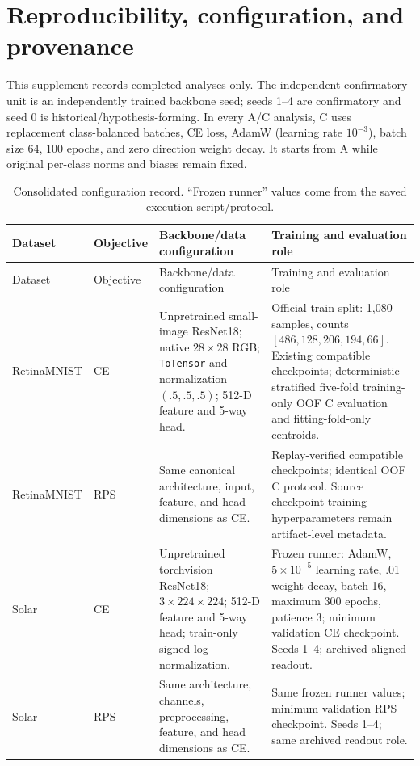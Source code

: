 \section{Reproducibility, configuration, and provenance}

This supplement records completed analyses only. The independent confirmatory
unit is an independently trained backbone seed; seeds 1--4 are confirmatory
and seed 0 is historical/hypothesis-forming. In every A/C analysis, C uses
replacement class-balanced batches, CE loss, AdamW (learning rate \(10^{-3}\)),
batch size 64, 100 epochs, and zero direction weight decay. It starts from A
while original per-class norms and biases remain fixed.

\begin{longtable}{p{.16\linewidth}p{.14\linewidth}p{.29\linewidth}p{.30\linewidth}}
\caption{Consolidated configuration record. ``Frozen runner'' values come from
the saved execution script/protocol.}\label{tab:supp-config}\\
\toprule
Dataset & Objective & Backbone/data configuration & Training and evaluation role \\
\midrule
\endfirsthead
\toprule
Dataset & Objective & Backbone/data configuration & Training and evaluation role \\
\midrule
\endhead
RetinaMNIST & CE & Unpretrained small-image ResNet18; native \(28\times28\) RGB; \texttt{ToTensor} and normalization \((.5,.5,.5)\); 512-D feature and 5-way head. & Official train split: 1,080 samples, counts \([486,128,206,194,66]\). Existing compatible checkpoints; deterministic stratified five-fold training-only OOF C evaluation and fitting-fold-only centroids. \\
RetinaMNIST & RPS & Same canonical architecture, input, feature, and head dimensions as CE. & Replay-verified compatible checkpoints; identical OOF C protocol. Source checkpoint training hyperparameters remain artifact-level metadata. \\
Solar & CE & Unpretrained torchvision ResNet18; \(3\times224\times224\); 512-D feature and 5-way head; train-only signed-log normalization. & Frozen runner: AdamW, \(5\times10^{-5}\) learning rate, .01 weight decay, batch 16, maximum 300 epochs, patience 3; minimum validation CE checkpoint. Seeds 1--4; archived aligned readout. \\
Solar & RPS & Same architecture, channels, preprocessing, feature, and head dimensions as CE. & Same frozen runner values; minimum validation RPS checkpoint. Seeds 1--4; same archived readout role. \\
\bottomrule
\end{longtable}

